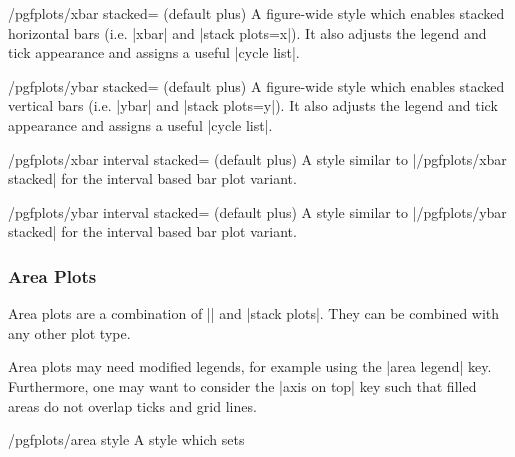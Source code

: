 \begin{stylekey}{/pgfplots/xbar stacked= (default plus)}
	A figure-wide style which enables stacked horizontal bars (i.e. |xbar| and |stack plots=x|). It also adjusts the legend and tick appearance and assigns a useful |cycle list|.
\end{stylekey}
\begin{stylekey}{/pgfplots/ybar stacked= (default plus)}
	A figure-wide style which enables stacked vertical bars (i.e. |ybar| and |stack plots=y|). It also adjusts the legend and tick appearance and assigns a useful |cycle list|.
\end{stylekey}

\begin{stylekey}{/pgfplots/xbar interval stacked= (default plus)}
	A style similar to |/pgfplots/xbar stacked| for the interval based bar plot variant.
\end{stylekey}
\begin{stylekey}{/pgfplots/ybar interval stacked= (default plus)}
	A style similar to |/pgfplots/ybar stacked| for the interval based bar plot variant.
\end{stylekey}

\subsubsection{Area Plots}
Area plots are a combination of |\closedcycle| and |stack plots|. They can be combined with any other plot type.

\begin{codeexample}[]
\end{codeexample}
\noindent
Area plots may need modified legends, for example using the |area legend| key. Furthermore, one may want to consider the |axis on top| key such that filled areas do not overlap ticks and grid lines. 

\begin{stylekey}{/pgfplots/area style}
	A style which sets
\begin{codeexample}
\end{codeexample}
\end{stylekey}

